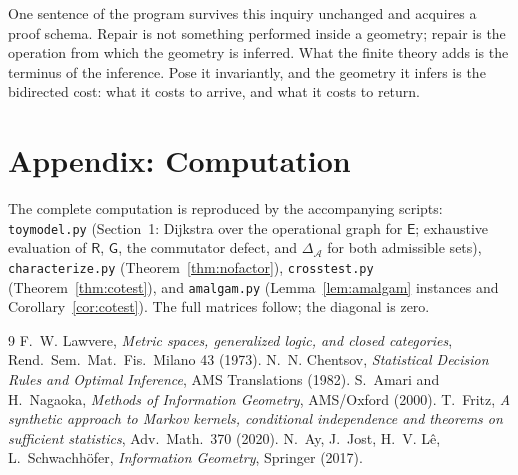 \documentclass[11pt]{article}
\theoremstyle{remark}
\newcommand{\A}{\mathcal{A}}
\newcommand{\R}{\mathsf{R}}
\newcommand{\E}{\mathsf{E}}
\newcommand{\G}{\mathsf{G}}
\begin{document}
One sentence of the program survives this inquiry unchanged and
acquires a proof schema. Repair is not something performed inside a
geometry; repair is the operation from which the geometry is
inferred. What the finite theory adds is the terminus of the
inference. Pose it invariantly, and the geometry it infers is the
bidirected cost: what it costs to arrive, and what it costs to
return.

\section*{Appendix: Computation}

The complete computation is reproduced by the accompanying scripts: \texttt{toymodel.py} (Section~1: Dijkstra over the operational graph for $\E$; exhaustive evaluation of $\R$, $\G$, the commutator defect, and $\Delta_{\A}$ for both admissible sets), \texttt{characterize.py} (Theorem~\ref{thm:nofactor}), \texttt{crosstest.py} (Theorem~\ref{thm:cotest}), and \texttt{amalgam.py} (Lemma~\ref{lem:amalgam} instances and Corollary~\ref{cor:cotest}). The full matrices follow; the diagonal is zero.



\begin{thebibliography}{9}
 F.~W. Lawvere, \emph{Metric spaces, generalized
logic, and closed categories}, Rend.\ Sem.\ Mat.\ Fis.\ Milano 43
(1973).
 N.~N. Chentsov, \emph{Statistical Decision Rules
and Optimal Inference}, AMS Translations (1982).
 S.~Amari and H.~Nagaoka, \emph{Methods of Information
Geometry}, AMS/Oxford (2000).
 T.~Fritz, \emph{A synthetic approach to Markov kernels,
conditional independence and theorems on sufficient statistics},
Adv.\ Math.\ 370 (2020).
 N.~Ay, J.~Jost, H.~V. L\^e, L.~Schwachh\"ofer,
\emph{Information Geometry}, Springer (2017).
\end{thebibliography}
\end{document}

